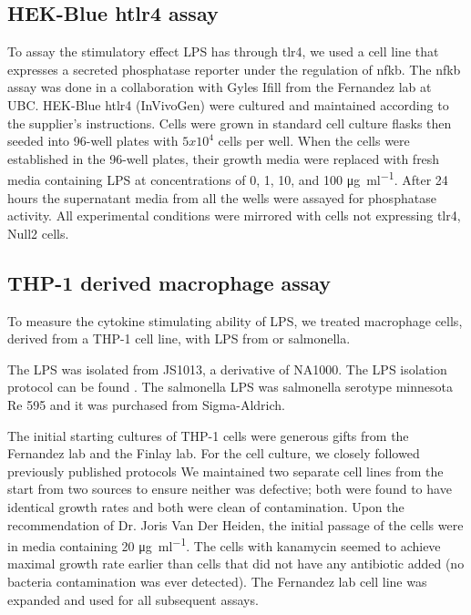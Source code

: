 \subsection{HEK-Blue h\ac{tlr4} assay}\label{sec:hek-blue-htlr4}
To assay the stimulatory effect \caulobacter{} \ac{LPS}  has through \ac{tlr4}, we used a cell line that expresses a secreted phosphatase reporter under the regulation of \ac{nfkb}.
The \ac{nfkb} assay was done in a collaboration with Gyles Ifill from the Fernandez lab at UBC. HEK-Blue h\ac{tlr4}\texttrademark{} (InVivoGen) were cultured and maintained according to the supplier's instructions. Cells were grown in standard cell culture flasks then seeded into 96-well plates with $5x10^{4}$ cells per well. When the cells were established in the 96-well plates, their growth media were replaced with fresh media containing \ac{LPS} at concentrations of 0, 1, 10, and 100 \si{\micro\gram\per\milli\litre}. After 24 hours the supernatant media from all the wells were assayed for phosphatase activity. All experimental conditions were mirrored with cells not expressing \ac{tlr4}, Null2 cells\texttrademark{}.
      
\subsection{THP-1 derived macrophage assay} \label{sec:thp-1-derived}
To measure the cytokine stimulating ability of \caulobacter{} \ac{LPS}, we treated macrophage cells, derived from a THP-1 cell line, with \ac{LPS} from \caulobacter{} or \ac{salmonella}. 
      
The \caulobacter{} \ac{LPS} was isolated from \caulobacter{} JS1013, a derivative of NA1000. The \ac{LPS} isolation protocol can be found . The \ac{salmonella} \ac{LPS} was \ac{salmonella} serotype minnesota Re 595 and it was purchased from Sigma-Aldrich.
      
The initial starting cultures of THP-1 cells were generous gifts from the Fernandez lab and the Finlay lab. For the cell culture, we closely followed previously published protocols We maintained two separate cell lines from the start from two sources to ensure neither was defective; both were found to have identical growth rates and both were clean of contamination. Upon the recommendation of Dr. Joris Van Der Heiden, the initial passage of the cells were in media containing 20 \si{\micro\gram\per\milli\litre}. The cells with kanamycin seemed to achieve maximal growth rate earlier than cells that did not have any antibiotic added (no bacteria contamination was ever detected). The Fernandez lab cell line was expanded and used for all subsequent assays.
      
